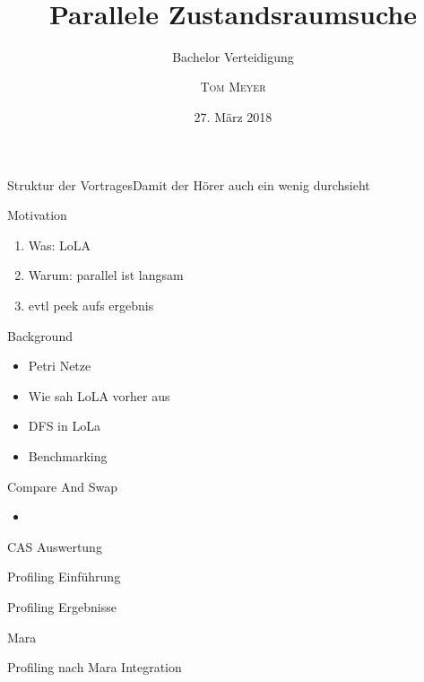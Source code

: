 \documentclass[10pt]{beamer} %
\title{\\\\\\\\Parallele Zustandsraumsuche}
\subtitle{Bachelor Verteidigung}
\author{\textsc{Tom Meyer}}
\date{27. März 2018}
\institute{Universität Rostock, Institut für Informatik}
\begin{document}
\begin{frame}%
  \titlepage
\end{frame}

\begin{frame}{Struktur der Vortrages}{Damit der H\"orer auch ein wenig durchsieht}
  \tableofcontents[pausesections]
\end{frame}

\begin{frame}{Motivation}
    \begin{enumerate}
      \item Was: LoLA
      \item Warum: parallel ist langsam
      \item evtl peek aufs ergebnis
    \end{enumerate}
\end{frame}

\begin{frame}{Background}
  \begin{itemize}
    \item Petri Netze
    \item Wie sah LoLA vorher aus
    \item DFS in LoLa
    \item Benchmarking
  \end{itemize}
\end{frame}

\begin{frame}{Compare And Swap}
  \begin{itemize}
    \item 
  \end{itemize}
\end{frame}

\begin{frame}{CAS Auswertung}
\end{frame}

\begin{frame}{Profiling Einführung}
\end{frame}

\begin{frame}{Profiling Ergebnisse}
\end{frame}

\begin{frame}{Mara}
\end{frame}

\begin{frame}{Profiling nach Mara Integration}
\end{frame}
\end{document}
